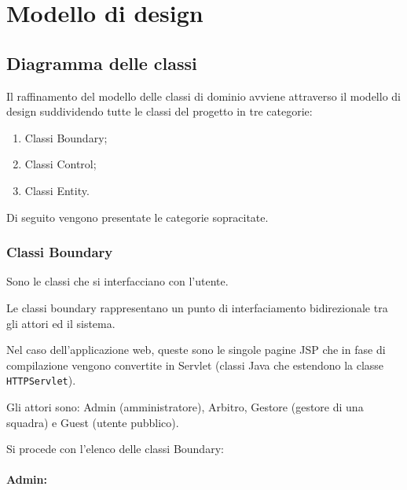 
\chapter{Modello di design}
\label{cap:modello-di-design}

\section{Diagramma delle classi}
	Il raffinamento del modello delle classi di dominio avviene attraverso il modello di design suddividendo tutte le classi del progetto in tre categorie:
	\begin{enumerate}
		
		\item
		Classi Boundary;
		
		\item
		Classi Control;
		
		\item
		Classi Entity.
		
	\end{enumerate}
	Di seguito vengono presentate le categorie sopracitate.

	\subsection{Classi Boundary}
	Sono le classi che si interfacciano con l'utente.
	
	Le classi boundary rappresentano un punto di interfaciamento bidirezionale tra gli attori ed il sistema.
	
	Nel caso dell'applicazione web, queste sono le singole pagine JSP che in fase di compilazione vengono convertite in Servlet (classi Java che estendono la classe \texttt{HTTPServlet}).
	
	Gli attori sono: Admin (amministratore), Arbitro, Gestore (gestore di una squadra) e Guest (utente pubblico).
	
	Si procede con l'elenco delle classi Boundary:
	
	\subsubsection*{Admin:}
	
